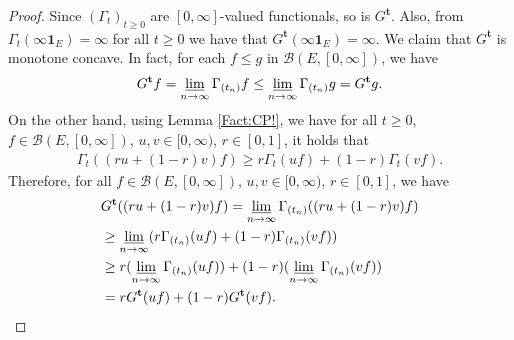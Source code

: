 \documentclass[12pt,a4paper]{amsart}
\numberwithin{equation}{section}
\theoremstyle{plain}
\theoremstyle{definition}
\theoremstyle{remark}
\begin{document}
\begin{proof}
	Since $(\Gamma_t)_{t\geq 0}$ are $[0,\infty]$-valued functionals, so is $G^{\mathbf t}$.
	Also, from $\Gamma_t(\infty \mathbf 1_E) = \infty$ for all $t\geq 0$ we have that $G^{\mathbf t}(\infty \mathbf 1_E) = \infty$.
	We claim that $G^\mathbf t$ is monotone concave.
	In fact, for each $f \leq g$ in $\mathcal B(E,[0,\infty])$, we have
	\begin{equation}
	G^{\mathbf t} f
	= \varliminf_{n\to \infty} \Gamma_{(t_n)} f
	\leq \varliminf_{n\to \infty} \Gamma_{(t_n)} g
	= G^{\mathbf t} g.
	\end{equation}
	On the other hand, using Lemma \ref{Fact:CP!}, we have for all $t\geq 0$, $f\in \mathcal B(E,[0,\infty])$, $u,v \in [0,\infty)$, $r\in [0,1]$, it holds that
	\begin{align}
	\Gamma_t((ru+(1-r) v)f)
	\geq r \Gamma_t (uf) + (1-r) \Gamma_t (vf).
	\end{align}
	Therefore, for all $f\in \mathcal B(E,[0,\infty])$, $u,v \in [0,\infty)$, $r \in [0,1]$, we have
	\begin{align}
	& G^{\mathbf t}((ru + (1-r)v)f)
	= \varliminf_{n \to \infty} \Gamma_{(t_n)}((ru + (1-r)v)f)
	\\&\geq \varliminf_{n\to \infty} (r\Gamma_{(t_n)} (uf) + (1-r)\Gamma_{(t_n)}(vf))
	\\&\geq r (\varliminf_{n\to \infty} \Gamma_{(t_n)} (uf)) + (1-r) (\varliminf_{n\to \infty} \Gamma_{(t_n)}(vf) )
	\\&= r G^{\mathbf t} (uf) + (1-r) G^{\mathbf t}(vf).
	\end{align}
	

\end{proof}
\end{document}
